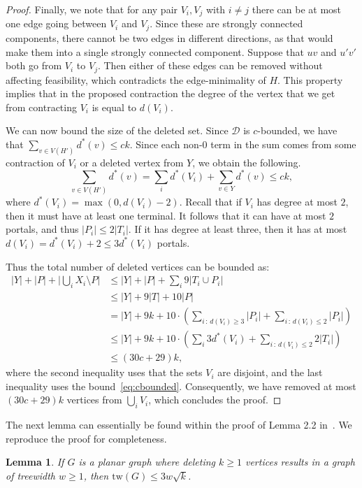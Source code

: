 \documentclass[a4paper,11pt]{article}
\newcommand{\calD}{\mathcal{D}}
\newcommand{\tw}{\mathrm{tw}}
\theoremstyle{plain}
\newtheorem{lemma}[theorem]{Lemma}
\newtheorem{identification rule}{Identification Rule}
\theoremstyle{definition}
\theoremstyle{remark}
\begin{document}
\begin{proof}
Finally, we note that for any pair $V_i,V_j$ with $i\neq j$ there can be at most one edge going between $V_i$ and $V_j$. Since these are strongly connected components, there cannot be two edges in different directions, as that would make them into a single strongly connected component. Suppose that $uv$ and $u'v'$ both go from $V_i$ to $V_j$. Then either of these edges can be removed without affecting feasibility, which contradicts the edge-minimality of $H$. This property implies that in the proposed contraction the degree of the vertex that we get from contracting $V_i$ is equal to $d(V_i)$.

We can now bound the size of the deleted set. Since $\calD$ is $c$-bounded, we have that $\sum_{v\in V(H')} d^*(v)\leq ck$. Since each non-0 term in the sum comes from some contraction of $V_i$ or a deleted vertex from $Y$, we obtain the following.
\begin{equation}\label{eq:cbounded}
\sum_{v\in V(H')} d^*(v) = \sum_i d^*(V_i) + \sum_{v\in Y} d^*(v)\leq ck,\end{equation}
where $d^*(V_i)=\max(0,d(V_i)-2)$.
Recall that if $V_i$ has degree at most $2$, then it must have at least one terminal. It follows that it can have at most $2$ portals, and thus $|P_i|\leq 2|T_i|$. If it has degree at least three, then it has at most $d(V_i)= d^*(V_i)+2\leq 3d^*(V_i)$ portals.

Thus the total number of deleted vertices can be bounded as:
\begin{align*}
|Y|+|P|+\Big|\bigcup_i X_i\setminus P\Big|&\leq |Y|+|P|+\sum_i 9|T_i\cup P_i|\\
&\leq |Y|+9|T|+10|P|\\
&= |Y|+9k + 10\cdot \left(\sum_{i\,:\,d(V_i)\geq 3} |P_i| + \sum_{i\,:\,d(V_i)\leq 2} |P_i|\right)\\
&\leq |Y| + 9k + 10\cdot \left(\sum_{i} 3d^*(V_i) + \sum_{i\,:\,d(V_i)\leq 2} 2|T_i|\right)\\
&\leq (30c+29)k,
\end{align*}
where the second inequality uses that the sets $V_i$ are disjoint, and the last inequality uses the bound~\eqref{eq:cbounded}.
Consequently, we have removed at most $(30c+29)k$ vertices from $\bigcup_i V_i$, which concludes the proof.
\end{proof}

The next lemma can essentially be found within the proof of Lemma 2.2 in~\cite{ChitnisFHM20}. 
We reproduce the proof for completeness.

\begin{lemma}\label{lem:twboundfromdeletion}
If $G$ is a planar graph where deleting $k\geq 1$ vertices results in a graph of treewidth $w\geq 1$, then $\tw(G)\leq 3w\sqrt{k}$.
\end{lemma}
\end{document}
